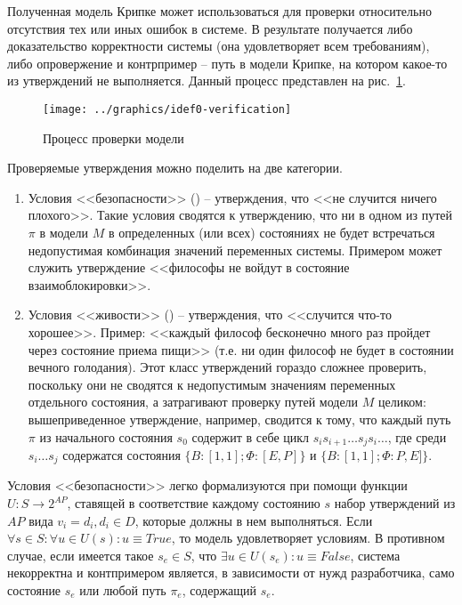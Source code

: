 Полученная модель Крипке может использоваться для проверки относительно отсутствия тех или
иных ошибок в системе. В результате получается либо доказательство корректности системы
(она удовлетворяет всем требованиям), либо опровержение и контрпример -- путь в модели
Крипке, на котором какое-то из утверждений не выполняется. Данный процесс представлен на
рис.~\ref{fig:idef0-verification}.

\begin{figure}[htb]
  \centering
  \texttt{[image: ../graphics/idef0-verification]}
  \caption{Процесс проверки модели}
  \label{fig:idef0-verification}
\end{figure}

Проверяемые утверждения можно поделить на две категории.
\begin{enumerate}
\item Условия <<безопасности>> () -- утверждения, что <<не случится ничего
  плохого>>. Такие условия сводятся к утверждению, что ни в одном из путей $\pi$ в модели
  $M$ в определенных (или всех) состояниях не будет встречаться недопустимая комбинация
  значений переменных системы. Примером может служить утверждение <<философы не войдут в
  состояние взаимоблокировки>>.
\item Условия <<живости>> () -- утверждения, что <<случится что-то
  хорошее>>. Пример: <<каждый философ бесконечно много раз пройдет через состояние приема
  пищи>> (т.е. ни один философ не будет в состоянии вечного голодания). Этот класс
  утверждений гораздо сложнее проверить, поскольку они не сводятся к недопустимым
  значениям переменных отдельного состояния, а затрагивают проверку путей модели $M$
  целиком: вышеприведенное утверждение, например, сводится к тому, что каждый путь $\pi$
  из начального состояния $s_0$ содержит в себе цикл $s_is_{i+1}\ldots s_js_i\ldots$, где
  среди $s_i\ldots s_j$ содержатся состояния $\{B: [1, 1]; \Phi: [E, P]\}$ и $\{B: [1, 1];
  \Phi: P, E]\}$.
\end{enumerate}

Условия <<безопасности>> легко формализуются при помощи функции $U: S \rightarrow 2^{AP}$,
ставящей в соответствие каждому состоянию $s$ набор утверждений из $AP$ вида $v_i = d_i,
d_i \in D$, которые должны в нем выполняться. Если $\forall s \in S:\forall u \in U(s):u \equiv
True$, то модель удовлетворяет условиям. В противном случае, если имеется такое $s_e \in
S$, что $\exists u \in U(s_e): u \equiv False$, система некорректна и контпримером является, в
зависимости от нужд разработчика, само состояние $s_e$ или любой путь $\pi_e$, содержащий
$s_e$.

